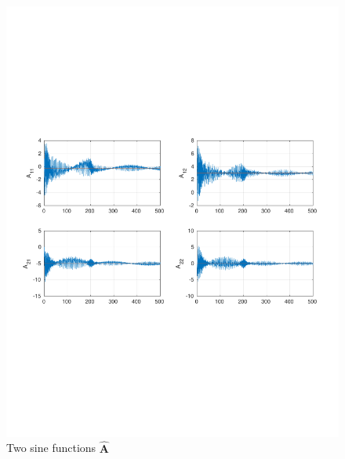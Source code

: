 \documentclass[]{article}
\begin{document}
\begin{figure}[H]
\centering
\includegraphics[width=1\columnwidth]{two_sine_A.pdf}
\caption{Two sine functions $\mathbf{\hat A}$}
\label{fig:two_sine_A}
\end{figure}
\end{document}
